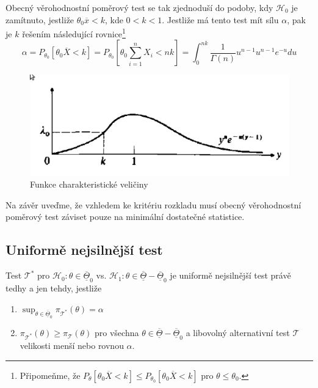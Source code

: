 \begin{example}
Obecný věrohodnostní poměrový test se tak zjednoduší do podoby, kdy $\mathscr{H}_0$ je zamítnuto, jestliže $\theta_0 \overline{x} < k$, kde $0 < k < 1$. Jestliže má tento test mít sílu $\alpha$, pak je $k$ řešením následující rovnice\footnote{Připomeňme, že $P_{\theta}[\theta_0 \overline{X} < k] \le P_{\theta_0}[\theta_0 \overline{X} < k]$ pro $\theta \le \theta_0$.}
\begin{equation*}
\alpha = P_{\theta_0}[\theta_0 \overline{X} < k] = P_{\theta_0}[\theta_0 \sum_{i = 1}^n X_i < nk] = \int_0^{nk} \frac{1}{\Gamma(n)}u^{n - 1}u^{n - 1}e^{-u}du
\end{equation*}
\end{example}

\begin{figure}[htp]
\centering
\includegraphics[scale = 0.5]{pictures/example_9_11.eps}
\caption{Funkce charakteristické veličiny}
\label{example_9_11}
\end{figure}

Na závěr uveďme, že vzhledem ke kritériu rozkladu musí obecný věrohodnostní poměrový test záviset pouze na minimální dostatečné statistice.

\subsection{Uniformě nejsilnější test}

\begin{definition}
Test $\mathscr{T}^*$ pro $\mathscr{H}_0: \theta \in \overline{\underline{\Theta}}_0$ vs. $\mathscr{H}_1: \theta \in \overline{\underline{\Theta}} - \overline{\underline{\Theta}}_0$ je uniformě nejsilnější test právě tedhy a jen tehdy, jestliže
\begin{enumerate}
\item $\sup_{\theta \in \overline{\underline{\Theta}}_0} \pi_{\mathscr{T}^*}(\theta) = \alpha$\\
\item $\pi_{\mathscr{T}^*}(\theta) \ge \pi_{\mathscr{T}}(\theta)$ pro všechna $\theta \in \overline{\underline{\Theta}} - \overline{\underline{\Theta}}_0$ a libovolný alternativní test $\mathscr{T}$ velikosti menší nebo rovnou $\alpha$.
\end{enumerate}
\end{definition}


